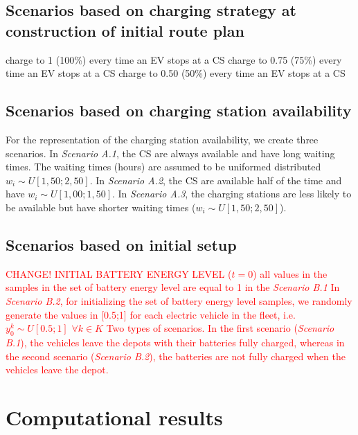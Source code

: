 \documentclass[11pt]{article}
\begin{document}
\subsection{Scenarios based on charging strategy at construction of initial route plan}
charge to 1 (100\%) every time an EV stops at a CS
charge to 0.75 (75\%) every time an EV stops at a CS
charge to 0.50 (50\%) every time an EV stops at a CS


\subsection{Scenarios based on charging station availability}
For the representation of the charging station availability, we create three scenarios. In \textit{Scenario A.1}, the CS are always available and have long waiting times. The waiting times (hours) are assumed to be uniformed distributed $w_i \sim U[1,50;2,50]$. In \textit{Scenario A.2}, the CS are available half of the time and have $w_i \sim U[1,00;1,50]$. In \textit{Scenario A.3}, the charging stations are less likely to be available but have shorter waiting times ($w_i \sim U[1,50;2,50]$).


\subsection{Scenarios based on initial setup}
\textcolor{red}{CHANGE! INITIAL BATTERY ENERGY LEVEL  ($t = 0$)
all values in the samples in the set of battery energy level are equal to 1 in the \textit{Scenario B.1}
In \textit{Scenario B.2}, for initializing the set of battery energy level samples, we randomly generate the values in [0.5;1] for each electric vehicle in the fleet, i.e. $y^k_0 \sim U[0.5;1]$ $\forall k \in K$ 
Two types of scenarios. In the first scenario (\textit{Scenario B.1}), the vehicles leave the depots with their batteries fully charged, whereas in the second scenario (\textit{Scenario B.2}), the batteries are not fully charged when the vehicles leave the depot.} 


\section{Computational results}
\label{section:results}
\end{document}
